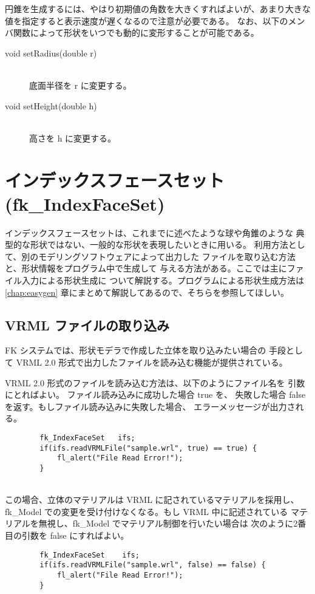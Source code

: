 円錐を生成するには、やはり初期値の角数を大きくすればよいが、あまり大きな
値を指定すると表示速度が遅くなるので注意が必要である。
なお、以下のメンバ関数によって形状をいつでも動的に変形することが可能である。

\begin{description}
\item[void setRadius(double r)] ~ \\
	底面半径を r に変更する。\\

\item[void setHeight(double h)] ~ \\
	高さを h に変更する。
\end{description}

\section{インデックスフェースセット (fk\_IndexFaceSet)}
インデックスフェースセットは、これまでに述べたような球や角錐のような
典型的な形状ではない、一般的な形状を表現したいときに用いる。
利用方法として、別のモデリングソフトウェアによって出力した
ファイルを取り込む方法と、形状情報をプログラム中で生成して
与える方法がある。ここでは主にファイル入力による形状生成に
ついて解説する。プログラムによる形状生成方法は
\ref{chap:easygen} 章にまとめて解説してあるので、そちらを参照してほしい。

\subsection{VRML ファイルの取り込み}
FK システムでは、形状モデラで作成した立体を取り込みたい場合の
手段として VRML 2.0 形式で出力したファイルを読み込む機能が提供されている。

VRML 2.0 形式のファイルを読み込む方法は、以下のようにファイル名を
引数にとればよい。
ファイル読み込みに成功した場合 true を、
失敗した場合 false を返す。もしファイル読み込みに失敗した場合、
エラーメッセージが出力される。
\\
\begin{screen}
\begin{verbatim}
        fk_IndexFaceSet   ifs;
        if(ifs.readVRMLFile("sample.wrl", true) == true) {
            fl_alert("File Read Error!");
        }
\end{verbatim}
\end{screen}
~ \\
この場合、立体のマテリアルは VRML に記されているマテリアルを採用し、
fk\_Model での変更を受け付けなくなる。もし VRML 中に記述されている
マテリアルを無視し、fk\_Model でマテリアル制御を行いたい場合は
次のように2番目の引数を false にすればよい。
\\
\begin{screen}
\begin{verbatim}
        fk_IndexFaceSet    ifs;
        if(ifs.readVRMLFile("sample.wrl", false) == false) {
            fl_alert("File Read Error!");
        }
\end{verbatim}
\end{screen}
